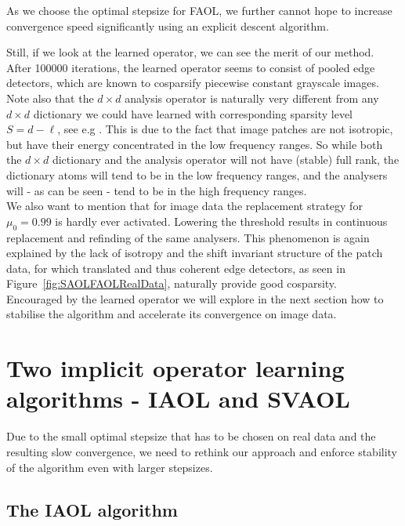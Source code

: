 \documentclass[11pt, onecolumn, journal,compsoc]{IEEEtran}
\theoremstyle{plain}
\theoremstyle{remark}
\begin{document}
As we choose the optimal stepsize for FAOL, we further cannot hope to increase convergence speed significantly using an explicit descent algorithm.

Still, if we look at the learned operator, we can see the merit of our method. After 100000 iterations, the learned operator seems to consist of pooled edge detectors, which are known to cosparsify piecewise constant grayscale images. Note also that the $d\times d$ analysis operator is naturally very different from any $d\times d$ dictionary we could have learned with corresponding sparsity level $S=d-\ell$, see e.g \cite{sc15}. This is due to the fact that image patches are not isotropic, but have their energy concentrated in the low frequency ranges. So while both the $d\times d$ dictionary and the analysis operator will not have (stable) full rank, the dictionary atoms will tend to be in the low frequency ranges, and the analysers will - as can be seen - tend to be in the high frequency ranges.\\
We also want to mention that for image data the replacement strategy for $\mu_0=0.99$ is hardly ever activated. Lowering the threshold results in continuous replacement and refinding of the same analysers. This phenomenon is again explained by the lack of isotropy and the shift invariant structure of the patch data, for which translated and thus coherent edge detectors, as seen in Figure~\ref{fig:SAOLFAOLRealData}, naturally provide good cosparsity.\\
Encouraged by the learned operator we will explore in the next section how to stabilise the algorithm and accelerate its convergence on image data.


\section{Two implicit operator learning algorithms - IAOL and SVAOL}\label{sec:backward}
Due to the small optimal stepsize that has to be chosen on real data and the resulting slow convergence, we need to rethink our approach and enforce stability of the algorithm even with larger stepsizes.  

\subsection{The IAOL algorithm}
\end{document}
